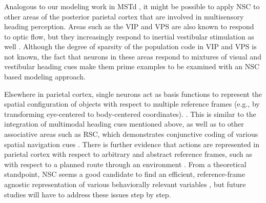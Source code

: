\subsubsection*{}

Analogous to our modeling work in \ac{MSTd} \cite{Beyeler2016},
it might be possible to apply \ac{NSC} to other areas of the posterior parietal
cortex that are involved in multisensory heading perception.
Areas such as the \ac{VIP} and \ac{VPS} are also known to respond to optic flow,
but they increasingly respond to inertial vestibular stimulation as well
\cite{Chen2011}.
Although the degree of sparsity of the population code in \ac{VIP} and \ac{VPS} is not known,
the fact that neurons in these areas respond to mixtures of visual and vestibular
heading cues make them prime examples 
to be examined with an \ac{NSC} based modeling approach.

Elsewhere in parietal cortex, single neurons act as basis functions 
to represent the spatial configuration of objects 
with respect to multiple reference frames
(e.g., by transforming eye-centered to body-centered coordinates).
\cite{Poggio1990,PougetSejnowski1997,PougetSnyder2000}.
This is similar to the integration of multimodal heading cues mentioned above,
as well as to other associative areas such as \ac{RSC},
which demonstrates conjunctive coding of various spatial navigation cues
\cite{AlexanderNitz2015,Rounds2018}.
There is further evidence that actions are represented in parietal cortex
with respect to arbitrary and abstract reference frames, 
such as with respect to a planned route through an environment \cite{nitz2009parietal}.
From a theoretical standpoint, \ac{NSC} seems a good candidate to find an efficient,
reference-frame agnostic representation of various behaviorally relevant variables
\cite{LouieGlimcher2012,louie2015adaptive,andersen1997multimodal,BenHamed2003},
but future studies will have to address these issues step by step.


\section*{}





